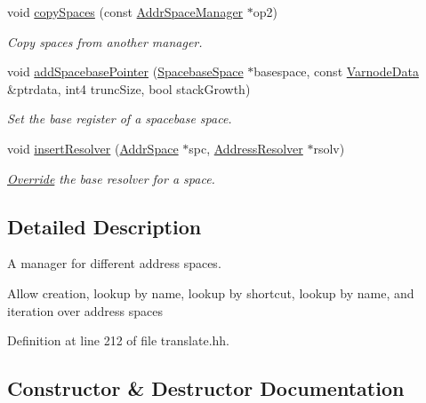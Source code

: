 \begin{DoxyCompactItemize}
void \mbox{\hyperlink{class_addr_space_manager_a45068bcc8331bebc780f00e51bd85250}{copy\+Spaces}} (const \mbox{\hyperlink{class_addr_space_manager}{Addr\+Space\+Manager}} $\ast$op2)
\begin{DoxyCompactList}\small\item\em Copy spaces from another manager. \end{DoxyCompactList}\item 
void \mbox{\hyperlink{class_addr_space_manager_a6dd0ab3084fd8bb9cb4ea5a84885704d}{add\+Spacebase\+Pointer}} (\mbox{\hyperlink{class_spacebase_space}{Spacebase\+Space}} $\ast$basespace, const \mbox{\hyperlink{struct_varnode_data}{Varnode\+Data}} \&ptrdata, int4 trunc\+Size, bool stack\+Growth)
\begin{DoxyCompactList}\small\item\em Set the base register of a spacebase space. \end{DoxyCompactList}\item 
void \mbox{\hyperlink{class_addr_space_manager_a6330481f1f40a24d860c820a5a2b64f5}{insert\+Resolver}} (\mbox{\hyperlink{class_addr_space}{Addr\+Space}} $\ast$spc, \mbox{\hyperlink{class_address_resolver}{Address\+Resolver}} $\ast$rsolv)
\begin{DoxyCompactList}\small\item\em \mbox{\hyperlink{class_override}{Override}} the base resolver for a space. \end{DoxyCompactList}\end{DoxyCompactItemize}


\subsection{Detailed Description}
A manager for different address spaces. 

Allow creation, lookup by name, lookup by shortcut, lookup by name, and iteration over address spaces 

Definition at line 212 of file translate.\+hh.



\subsection{Constructor \& Destructor Documentation}
\mbox{\label{class_addr_space_manager_a7012cd8aa3869a8db478ef71dfd04756}} 
